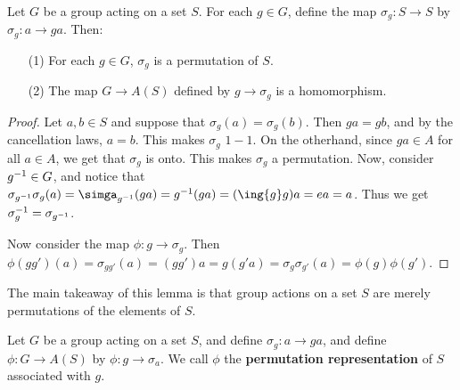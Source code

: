 \begin{lemma}\label{4.1.1}
    Let $G$ be a group acting on a set $S$. For each $g \in G$, define the map
    $\sigma_g:S \rightarrow S$ by $\sigma_g:a \rightarrow ga$. Then:
    \begin{enumerate}
        \item[(1)] For each $g \in G$,  $\sigma_g$ is a permutation of  $S$.

        \item [(2)] The map $G \rightarrow A(S)$ defined by $g \rightarrow
            \sigma_g$ is a homomorphism.
    \end{enumerate}
\end{lemma}
\begin{proof}
    Let $a,b \in S$ and suppose that $\sigma_g(a)=\sigma_g(b)$. Then $ga=gb$,
    and by the cancellation laws,  $a=b$. This makes $\sigma_g$  $1-1$. On the
    otherhand, since $ga \in A$ for all $a \in A$, we get that $\sigma_g$ is
    onto. This makes  $\sigma_g$ a permutation. Now, consider  $g^{-1} \in G$,
    and notice that
    $\sigma_{\inv{g}}\sigma_g(a)=\simga_{\inv{g}}(ga)=\inv{g}(ga)=(\ing{g}g)a=ea=a$.
    Thus we get $\sigma_g^{-1}=\sigma_{g^{-1}}$.

    Now consider the map $\phi:g \rightarrow \sigma_g$. Then
    $\phi(gg')(a)=\sigma_{gg'}(a)=(gg')a=g(g'a)=\sigma_g\sigma_{g'}(a)=
    \phi(g)\phi(g')$.
\end{proof}
\begin{remark}
    The main takeaway of this lemma is that group actions on a set $S$ are
    merely permutations of the elements of  $S$.
\end{remark}

\begin{definition}
    Let $G$ be a group acting on a set  $S$, and define $\sigma_g:a \rightarrow
    ga$, and define $\phi:G \rightarrow A(S)$ by $\phi:g \rightarrow \sigma_a$.
    We call $\phi$ the  \textbf{permutation representation} of $S$ associated
    with  $g$.
\end{definition}

